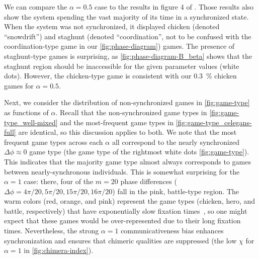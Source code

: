 \documentclass[pdflatex,lineno,referee,sn-nature]{sn-jnl}
\begin{document}
We can compare the $\alpha = 0.5$ case
to the results in figure 4 of \tripp{}.
Those results also show the system spending the vast majority
of its time in a synchronized state.
When the \tripp{} system was not synchronized,
it displayed chicken (denoted ``snowdrift'')
and staghunt (denoted ``coordination'',
not to be confused with the coordination-type game
in our \cref{fig:phase-diagram}) games.
The presence of staghunt-type games is surprising,
as \cref{fig:phase-diagram-B_beta}
shows that the staghunt region should be inaccessible
for the given parameter values (white dots).
However, the chicken-type game is consistent with our
\SI{0.3}{\percent} chicken games for $\alpha = 0.5$.

Next, we consider the distribution of non-synchronized games
in \cref{fig:game-type} as functions of $\alpha$.
Recall that the non-synchronized game types
in \cref{fig:game-type_well-mixed}
and the most-frequent game types in \cref{fig:game-type_celegans-full}
are identical,
so this discussion applies to both.
We note that the most frequent game types
across each $\alpha$ all correspond
to the nearly synchronized $\Delta \phi \approx 0$ game type
(\ie the game type of the rightmost white dots \cref{fig:game-type}).
This indicates that the majority game type almost always
corresponds to games between nearly-synchronous individuals.
This is somewhat surprising for the $\alpha = 1$ case:
there, four of the $m = 20$ phase differences
($\Delta \phi = 4 \pi/20, 5 \pi/20, 15\pi/20, 16\pi/20$)
fall in the pink, battle-type region.
The warm colors (red, orange, and pink)
represent the game types (chicken, hero, and battle, respectively)
that have exponentially slow fixation times~\citep{antal2006fixation},
so one might expect that these games would be over-represented
due to their long fixation times.
Nevertheless, the strong $\alpha = 1$ communicativeness bias
enhances synchronization and ensures that
chimeric qualities are suppressed
(\cf the low $\chi$ for $\alpha = 1$ in \cref{fig:chimera-index}).
\end{document}
